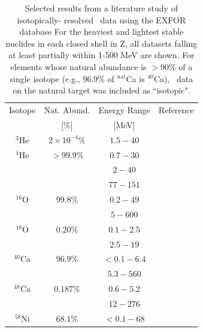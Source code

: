 \begin{table}[ht]
    \caption[Selected results from a literature study of isotopically-
        resolved \tot\ data using the EXFOR database \cite{EXFORDatabase}]
        {Selected results from a literature study of isotopically-
        resolved \tot\ data using the EXFOR database \cite{EXFORDatabase}
        For the heaviest and lightest stable nuclides in each closed shell in Z, all
        datasets falling at least partially within 1-500 MeV are shown. For elements
        whose natural abundance is $>$90\% of a single isotope (e.g.,
        96.9\% of $^{\text{nat}}$Ca is $^{40}$Ca), \tot\ data on the natural
        target was included as ``isotopic".}
    \label{IsotopicCrossSectionTable}
    \begin{center}
        \begin{tabular}{ c c c c }
            \hline
            Isotope & Nat. Abund. & Energy Range & Reference \\ & [\%] & [MeV] & \\

            \hline

            $^{3}$He & $2\times 10^{-4}\%$ & $1.5 - 40$ & \cite{Haesner1983}\\
            $^{4}$He & $>99.9\%$ & $0.7-30$ & \cite{Goulding1973}\\
            & & $2-40$ & \cite{Haesner1983}\\
            & & $77-151$ & \cite{Measday1966}\\

            $^{16}$O & $99.8\%$ & $0.2-49$ & \cite{Perey1972}\\
            & & $5-600$ & \cite{Finlay1993}\\

            $^{18}$O & $0.20\%$ & $0.1-2.5$ & \cite{Vaughn1965}\\
            & & $2.5-19$ & \cite{Salisbury1965}\\

            $^{40}$Ca & $96.9\%$ & $<0.1-6.4$ & \cite{Johnson1973}\\
            & & $5.3-560$ & \cite{Abfalterer2001}\\

            $^{48}$Ca & $0.187\%$ & $0.6-5.2$ & \cite{Harvey1985}\\
            & & $12-276$ & \cite{Shane2010}\\

            $^{58}$Ni & $68.1\%$ & $<0.1-68$ & \cite{Perey1993}\\


\end{tabular}
\end{center}
\end{table}
